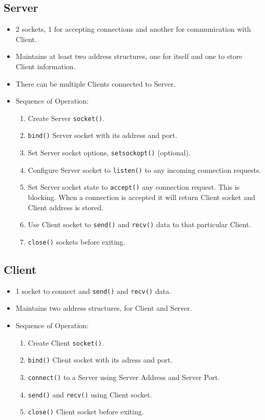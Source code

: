 \documentclass[12pt,a4paper]{article}
\begin{document}
\subsection{Server}
\begin{itemize}
\item 2 sockets, 1 for accepting connections and another for communication with  Client.
\item Maintains at least two address structures, one for itself and one to store Client information. 
\item There can be multiple Clients connected to Server.
\item Sequence of Operation:
	\begin{enumerate}
    \item Create Server \verb|socket()|.
    \item \verb|bind()| Server socket with its address and port.
    \item Set Server socket options, \verb|setsockopt()| (optional).
    \item Configure Server socket to \verb|listen()| to any incoming connection requests.
    \item Set Server socket state to \verb|accept()| any connection request. This is blocking. When a connection is accepted it will return Client socket and Client address is stored.
    \item Use Client socket to \verb|send()| and \verb|recv()| data to that particular Client.
    \item \verb|close()| sockets before exiting.
	\end{enumerate}
\end{itemize}
\subsection{Client}
\begin{itemize}
\item 1 socket to connect and \verb|send()| and \verb|recv()| data.
\item Maintains two address structures, for Client and Server.
\item Sequence of Operation:
	\begin{enumerate}
    \item Create Client \verb|socket()|.
    \item \verb|bind()| Client socket with its adress and port.
    \item \verb|connect()| to a Server using Server Address and Server Port.
    \item \verb|send()| and \verb|recv()| using Client socket.
    \item \verb|close()| Client socket before exiting.
	\end{enumerate}
\end{itemize}
\end{document}
